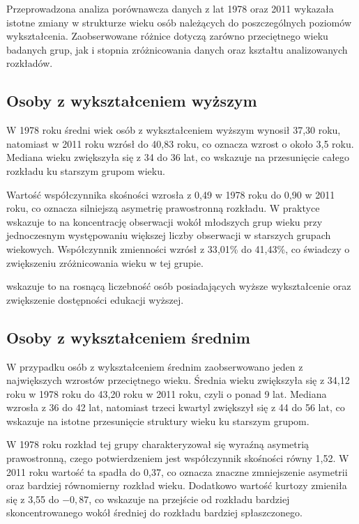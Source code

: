 \documentclass[15pt]{article}
\begin{document}
Przeprowadzona analiza porównawcza danych z lat 1978 oraz 2011 wykazała istotne zmiany w strukturze wieku osób należących do poszczególnych poziomów wykształcenia. Zaobserwowane różnice dotyczą zarówno przeciętnego wieku badanych grup, jak i stopnia zróżnicowania danych oraz kształtu analizowanych rozkładów.

\subsection{Osoby z wykształceniem wyższym}

W 1978 roku średni wiek osób z wykształceniem wyższym wynosił 37{,}30 roku, natomiast w 2011 roku wzrósł do 40{,}83 roku, co oznacza wzrost o około 3{,}5 roku. Mediana wieku zwiększyła się z 34 do 36 lat, co wskazuje na przesunięcie całego rozkładu ku starszym grupom wieku.

Wartość współczynnika skośności wzrosła z 0{,}49 w 1978 roku do 0{,}90 w 2011 roku, co oznacza silniejszą asymetrię prawostronną rozkładu. W praktyce wskazuje to na koncentrację obserwacji wokół młodszych grup wieku przy jednoczesnym występowaniu większej liczby obserwacji w starszych grupach wiekowych. Współczynnik zmienności wzrósł z 33{,}01\% do 41{,}43\%, co świadczy o zwiększeniu zróżnicowania wieku w tej grupie.

wskazuje to na rosnącą liczebność osób posiadających wyższe wykształcenie oraz zwiększenie dostępności edukacji wyższej.

\subsection{Osoby z wykształceniem średnim}

W przypadku osób z wykształceniem średnim zaobserwowano jeden z największych wzrostów przeciętnego wieku. Średnia wieku zwiększyła się z 34{,}12 roku w 1978 roku do 43{,}20 roku w 2011 roku, czyli o ponad 9 lat. Mediana wzrosła z 36 do 42 lat, natomiast trzeci kwartyl zwiększył się z 44 do 56 lat, co wskazuje na istotne przesunięcie struktury wieku ku starszym grupom.

W 1978 roku rozkład tej grupy charakteryzował się wyraźną asymetrią prawostronną, czego potwierdzeniem jest współczynnik skośności równy 1{,}52. W 2011 roku wartość ta spadła do 0{,}37, co oznacza znaczne zmniejszenie asymetrii oraz bardziej równomierny rozkład wieku. Dodatkowo wartość kurtozy zmieniła się z 3{,}55 do $-0{,}87$, co wskazuje na przejście od rozkładu bardziej skoncentrowanego wokół średniej do rozkładu bardziej spłaszczonego.
\end{document}
